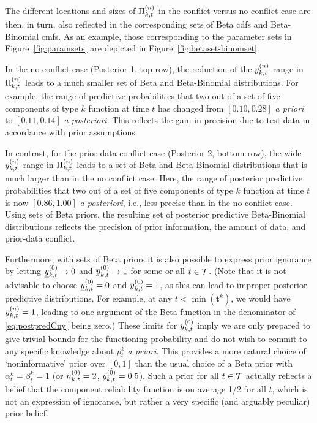 \documentclass[12pt, a4paper]{elsarticle}
\newcommand{\bs}[1]{\boldsymbol{#1}}
\renewcommand{\vec}[1]{{\bs#1}}
\begin{document}
The different locations and sizes of $\Pi^{(n)}_{k,t}$ in the conflict versus no conflict case are then, in turn,
also reflected in the corresponding sets of Beta cdfs and Beta-Binomial cmfs.
As an example, those corresponding to the parameter sets in Figure~\ref{fig:paramsets}
are depicted in Figure~\ref{fig:betaset-binomset}.

In the no conflict case (Posterior 1, top row),
the reduction of the $y^{(n)}_{k,t}$ range in $\Pi^{(n)}_{k,t}$ leads to a much smaller set
of Beta and Beta-Binomial distributions.
For example, the range of predictive probabilities
that two out of a set of five components of type $k$ function at time $t$ 
has changed from $[0.10, 0.28]$ \emph{a priori} to $[0.11,0.14]$ \emph{a posteriori}.
This reflects the gain in precision due to test data in accordance with prior assumptions.

In contrast, for the prior-data conflict case (Posterior 2, bottom row),
the wide $y^{(n)}_{k,t}$ range in $\Pi^{(n)}_{k,t}$ leads to a set of Beta and Beta-Binomial distributions
that is much larger than in the no conflict case.
Here, the range of posterior predictive probabilities
that two out of a set of five components of type $k$ function at time $t$
is now $[0.86, 1.00]$ \emph{a posteriori}, i.e., less precise than in the no conflict case.
Using sets of Beta priors, the resulting set of posterior predictive Beta-Binomial distributions
reflects the precision of prior information,
the amount of data, and prior-data conflict.

Furthermore, with sets of Beta priors it is also possible
to express prior ignorance
by letting $\underline{y}^{(0)}_{k,t} \to 0$ and $\overline{y}^{(0)}_{k,t} \to 1$
for some or all $t \in {\cal T}$.
(Note that it is not advisable to choose $\underline{y}^{(0)}_{k,t} = 0$ and $\overline{y}^{(0)}_{k,t} = 1$,
as this can lead to improper posterior predictive distributions.
For example, at any $t < \min(\vec{t}^k)$,
we would have $\overline{y}^{(n)}_{k,t} = 1$, leading to one argument of the Beta function
in the denominator of \eqref{eq:postpredCny} being zero.)
These limits for $y^{(0)}_{k,t}$ imply we are only prepared to give trivial bounds for the functioning probability
and do not wish to commit to any specific knowledge about $p^k_t$ \emph{a priori}.
This provides a more natural choice of `noninformative' prior over $[0,1]$ than the usual choice of
a Beta prior with $\alpha^k_t = \beta^k_t = 1$ (or $n^{(0)}_{k,t} = 2$, $y^{(0)}_{k,t} = 0.5$).
Such a prior for all $t \in {\cal T}$ actually reflects a belief that the component reliability function
is on average 1/2 for all $t$, which is not an expression of ignorance, but rather a very specific (and arguably peculiar) prior belief.
\end{document}
